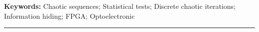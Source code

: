 \documentclass[french,book,nopubpage,nodocumentinfo]{upmethodology-document}
\renewcommand{\headrulewidth}{1.0pt}
\renewcommand{\headrulewidth}{0pt}
\newenvironment{vcenterpage}
{\newpage\vspace*{\fill}\thispagestyle{empty}\renewcommand{\headrulewidth}{0pt}}
{\vspace*{\fill}}
\begin{document}
\begin{vcenterpage}
{\large\textbf{Keywords:}}
Chaotic sequences; Statistical tests; Discrete chaotic iterations; Information hiding; FPGA; Optoelectronic
\\
\noindent\rule[2pt]{\textwidth}{0.5pt}
\end{vcenterpage}
\end{document}

